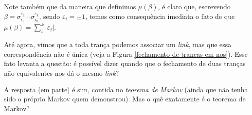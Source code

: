 	\par\vspace{0.3cm} Note também que da maneira que definimos $\mu(\beta)$, é claro que, 
	escrevendo $\beta = \sigma_{i_1}^{\varepsilon_1}\cdots\sigma_{i_k}^{\varepsilon_k}$, 
	sendo $\varepsilon_i = \pm1$, temos como consequência imediata o fato de que 
	$\mu(\beta) = \displaystyle{\sum_{i}^{k}|\varepsilon_i|}$.
	
	\par\vspace{0.3cm} Até agora, vimos que a toda trança podemos associar um \textit{link}, 
	mas que essa correspondência não é única (veja a Figura \ref{fechamento de trancas em nos}). 
	Esse fato levanta a questão: é possível dizer quando que o fechamento de duas tranças não 
	equivalentes nos dá o mesmo \textit{link}?
	
	\par\vspace{0.3cm} A resposta (em parte) é sim, contida no \textit{teorema de Markov} 
	(ainda que não tenha sido o próprio Markov quem demonstrou). Mas o quê exatamente é o teorema de Markov?
	
